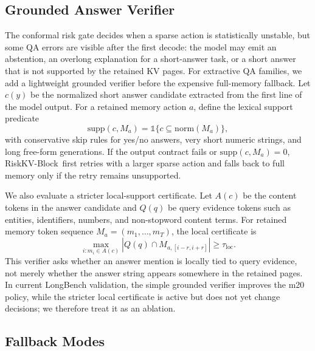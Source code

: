 \documentclass{article}
\newcommand{\method}{RiskKV-Block}
\begin{document}
\subsection{Grounded Answer Verifier}

The conformal risk gate decides when a sparse action is statistically unstable, but some QA errors are visible after the first decode:
the model may emit an abstention, an overlong explanation for a short-answer task, or a short answer that is not supported by the retained KV pages.
For extractive QA families, we add a lightweight grounded verifier before the expensive full-memory fallback.
Let $c(y)$ be the normalized short answer candidate extracted from the first line of the model output.
For a retained memory action $a$, define the lexical support predicate
\begin{equation}
    \mathrm{supp}(c, M_a)
    =
    \mathbb{1}\{c \subseteq \mathrm{norm}(M_a)\},
    \label{eq:grounded-support}
\end{equation}
with conservative skip rules for yes/no answers, very short numeric strings, and long free-form generations.
If the output contract fails or $\mathrm{supp}(c,M_a)=0$, \method\ first retries with a larger sparse action and falls back to full memory only if the retry remains unsupported.

We also evaluate a stricter local-support certificate.
Let $A(c)$ be the content tokens in the answer candidate and $Q(q)$ be query evidence tokens such as entities, identifiers, numbers, and non-stopword content terms.
For retained memory token sequence $M_a=(m_1,\ldots,m_T)$, the local certificate is
\begin{equation}
    \max_{i:m_i\in A(c)}
    \left|
    Q(q)\cap M_{a,[i-r,i+r]}
    \right|
    \geq \tau_{\mathrm{loc}}.
    \label{eq:local-grounding}
\end{equation}
This verifier asks whether an answer mention is locally tied to query evidence, not merely whether the answer string appears somewhere in the retained pages.
In current LongBench validation, the simple grounded verifier improves the m20 policy, while the stricter local certificate is active but does not yet change decisions; we therefore treat it as an ablation.

\subsection{Fallback Modes}
\end{document}
